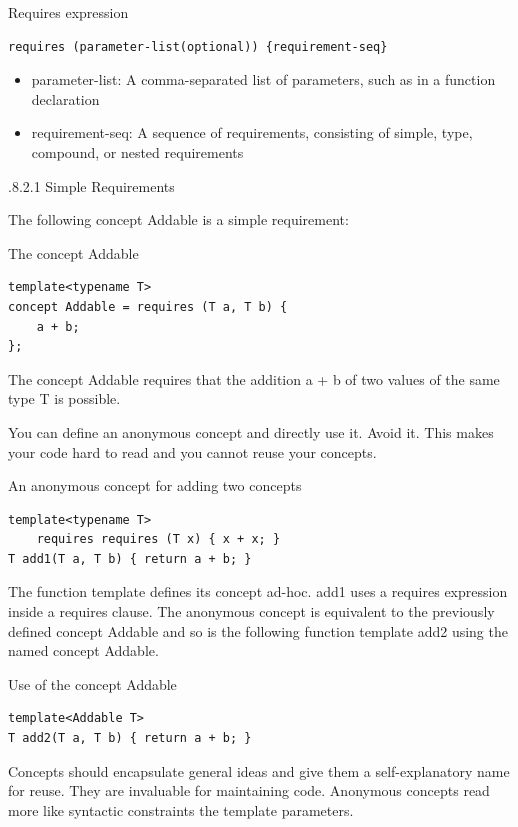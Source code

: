 \noindent
Requires expression
\begin{lstlisting}[style=styleCXX]
requires (parameter-list(optional)) {requirement-seq}
\end{lstlisting}

\begin{itemize}
\item 
parameter-list: A comma-separated list of parameters, such as in a function declaration

\item 
requirement-seq: A sequence of requirements, consisting of simple, type, compound, or nested requirements
\end{itemize}

.8.2.1\hspace{0.2cm} Simple Requirements

The following concept Addable is a simple requirement:

\noindent
The concept Addable
\begin{lstlisting}[style=styleCXX]
template<typename T>
concept Addable = requires (T a, T b) {
	a + b;
};
\end{lstlisting}

The concept Addable requires that the addition a + b of two values of the same type T is possible.

\begin{tcolorbox}[colback=blue!5!white,colframe=blue!75!black,title=Avoid Anonymous Concepts: requires requires]
	
You can define an anonymous concept and directly use it. Avoid it. This makes your code hard to read and you cannot reuse your concepts.

\noindent
An anonymous concept for adding two concepts
\begin{lstlisting}[style=styleCXX]
template<typename T>
	requires requires (T x) { x + x; }
T add1(T a, T b) { return a + b; }
\end{lstlisting}

The function template defines its concept ad-hoc. add1 uses a requires expression inside a requires clause. The anonymous concept is equivalent to the previously defined concept Addable and so is the following function template add2 using the named concept Addable.

\noindent
Use of the concept Addable
\begin{lstlisting}[style=styleCXX]
template<Addable T>
T add2(T a, T b) { return a + b; }
\end{lstlisting}

Concepts should encapsulate general ideas and give them a self-explanatory name for reuse. They are invaluable for maintaining code. Anonymous concepts read more like syntactic constraints the template parameters.
	
\end{tcolorbox}

